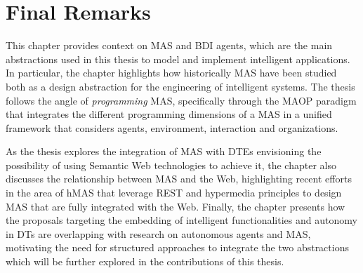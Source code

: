 \section{Final Remarks}

This chapter provides context on \ac{MAS} and \ac{BDI} agents, which are the main abstractions used in this thesis to model and implement intelligent applications.
%
In particular, the chapter highlights how historically \ac{MAS} have been studied both as a design abstraction for the engineering of intelligent systems.
%
The thesis follows the angle of \emph{programming} \ac{MAS}, specifically through the \ac{MAOP} paradigm that integrates the different programming dimensions of a \ac{MAS} in a unified framework that considers agents, environment, interaction and organizations.

As the thesis explores the integration of \ac{MAS} with \acp{DTE} envisioning the possibility of using Semantic Web technologies to achieve it, the chapter also discusses the relationship between \ac{MAS} and the Web, highlighting recent efforts in the area of \ac{hMAS} that leverage \ac{REST} and hypermedia principles to design \ac{MAS} that are fully integrated with the Web.
%
Finally, the chapter presents how the proposals targeting the embedding of intelligent functionalities and autonomy in \acp{DT} are overlapping with research on autonomous agents and \ac{MAS}, motivating the need for structured approaches to integrate the two abstractions which will be further explored in the contributions of this thesis. 
